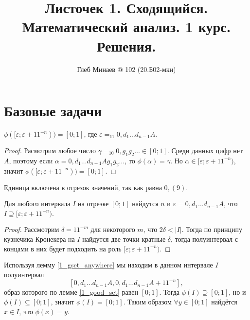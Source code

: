 \documentclass[12pt,a4paper]{article}
\title{Листочек 1. Сходящийся.\\Математический анализ. 1 курс.\\Решения.}
\author{Глеб Минаев @ 102 (20.Б02-мкн)}
\begin{document}
    \maketitle
    \section*{Базовые задачи}

    \begin{enumproblem}[\textcolor{green}{сдано}]
        \begin{lemma}\label{1_good_set}
            $\phi([\varepsilon;\varepsilon + 11^{-n}))=[0;1]$, где $\varepsilon =_{11} 0{,}d_1\dots d_{n-1}A$. 
        \end{lemma}
        
        \begin{proof}
            Расмотрим любое число $\gamma =_{10} 0{,}g_1g_2\dots \in [0;1]$. Среди данных цифр нет $A$, поэтому если $\alpha = 0{,}d_1\dots d_{n-1}Ag_1g_2\dots$, то $\phi(\alpha) = \gamma$. Но $\alpha \in [\varepsilon;\varepsilon + 11^{-n})$, значит $\phi([\varepsilon;\varepsilon + 11^{-n})) = [0;1]$.
        \end{proof}

        \begin{remark}
            Единица включена в отрезок значений, так как равна $0{,}(9)$.
        \end{remark}

        \begin{lemma}\label{1_gset_anywhere}
            Для любого интервала $I$ на отрезке $[0;1]$ найдутся $n$ и $\varepsilon = 0{,}d_1\dots d_{n-1}A$, что $I \supseteq [\varepsilon; \varepsilon + 11^{-n})$.
        \end{lemma}

        \begin{proof}
            Рассмотрим $\delta = 11^{-m}$ для некоторого $m$, что $2\delta < |I|$. Тогда по принципу кузнечика Кронекера на $I$ найдутся две точки кратные $\delta$, тогда полуинтервал с концами в них будет подходить на роль $[\varepsilon;\varepsilon + 11^{-n})$.
        \end{proof}

        Используя лемму \ref{1_gset_anywhere} мы находим в данном интервале $I$ полуинтервал
        \[[0{,}d_1\dots d_{n-1}A, 0{,}d_1\dots d_{n-1}A + 11^{-n}],\]
        образ которого по лемме \ref{1_good_set} равен $[0;1]$. Тогда $\phi(I) \supseteq [0;1]$, но и $\phi(I) \subseteq [0;1]$, значит $\phi(I) = [0;1]$. Таким образом $\forall y \in [0;1]$ найдётся $x \in I$, что $\phi(x) = y$.
    \end{enumproblem}
\end{document}
